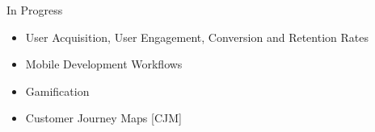 %
In Progress %
  \begin{itemize}
    \setlength\itemsep{-0.3em}
\item User Acquisition, User Engagement, %
Conversion and Retention Rates %
\item Mobile Development Workflows
\item Gamification
\item Customer Journey Maps [CJM]
\end{itemize}





